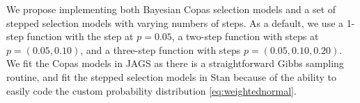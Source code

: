 \documentclass[12pt]{article}   	%
\numberwithin{equation}{section}
\begin{document}
We propose implementing both Bayesian Copas selection models \citep{mavridis2013copas, bai2020} and a set of stepped selection models with varying numbers of steps. As a default, we use a 1-step function with the step at $p=0.05$, a two-step function with steps at $p = (0.05, 0.10)$, and a three-step function with steps $p = (0.05, 0.10, 0.20)$. We fit the Copas models in JAGS \citep{plummer2003jags} as there is a straightforward Gibbs sampling routine, and fit the stepped selection models in Stan \citep{gelman2015stan} because of the ability to easily code the custom probability distribution \eqref{eq:weightednormal}. 


%
%



\end{document}
